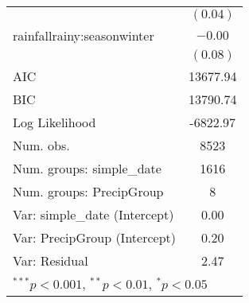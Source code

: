 \begin{table}
\begin{center}
\begin{tabular}{l c }
                                  & $(0.04)$      \\
rainfallrainy:seasonwinter        & $-0.00$       \\
                                  & $(0.08)$      \\
\hline
AIC                               & 13677.94      \\
BIC                               & 13790.74      \\
Log Likelihood                    & -6822.97      \\
Num. obs.                         & 8523          \\
Num. groups: simple_date          & 1616          \\
Num. groups: PrecipGroup          & 8             \\
Var: simple_date (Intercept)      & 0.00          \\
Var: PrecipGroup (Intercept)      & 0.20          \\
Var: Residual                     & 2.47          \\
\hline
\multicolumn{2}{l}{\scriptsize{$^{***}p<0.001$, $^{**}p<0.01$, $^*p<0.05$}}
\end{tabular}
\label{table:soil_moisture_model}
\end{center}
\end{table}
